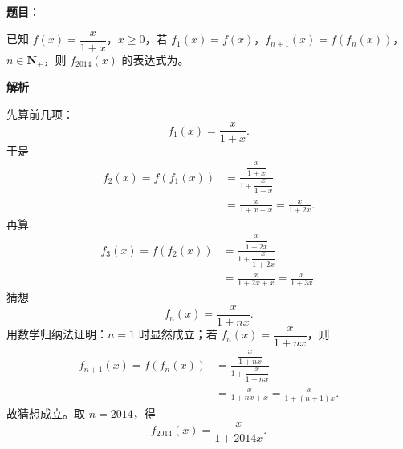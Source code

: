 \begin{answer}

\textbf{题目}：

已知 $f(x)=\dfrac{x}{1+x}$，$x\geqslant 0$，若 $f_1(x)=f(x)$，$f_{n+1}(x)=f(f_n(x))$，$n\in\mathbf N_+$，则 $f_{2014}(x)$ 的表达式为\gkblank{}。

\textbf{解析}

先算前几项：
\nopagebreak[4]
\[f_1(x)=\frac{x}{1+x}.\]
于是
\nopagebreak[4]
\[\begin{aligned}
f_2(x)=f(f_1(x))
&=\frac{\dfrac{x}{1+x}}{1+\dfrac{x}{1+x}}\\
&=\frac{x}{1+x+x}=\frac{x}{1+2x}.
\end{aligned}\]
再算
\nopagebreak[4]
\[\begin{aligned}
f_3(x)=f(f_2(x))
&=\frac{\dfrac{x}{1+2x}}{1+\dfrac{x}{1+2x}}\\
&=\frac{x}{1+2x+x}=\frac{x}{1+3x}.
\end{aligned}\]
猜想
\nopagebreak[4]
\[f_n(x)=\frac{x}{1+nx}.\]
用数学归纳法证明：$n=1$ 时显然成立；若 $f_n(x)=\dfrac{x}{1+nx}$，则
\nopagebreak[4]
\[\begin{aligned}
f_{n+1}(x)=f(f_n(x))
&=\frac{\dfrac{x}{1+nx}}{1+\dfrac{x}{1+nx}}\\
&=\frac{x}{1+nx+x}=\frac{x}{1+(n+1)x}.
\end{aligned}\]
故猜想成立。取 $n=2014$，得
\nopagebreak[4]
\[f_{2014}(x)=\frac{x}{1+2014x}.\]


\end{answer}
